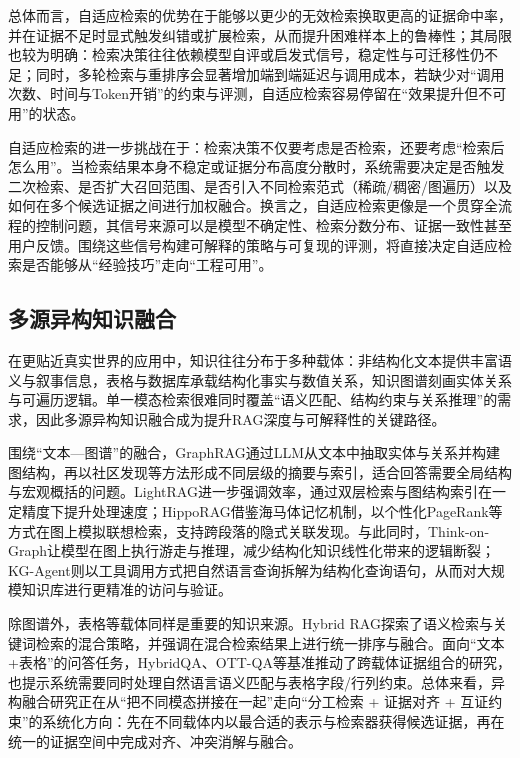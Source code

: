 总体而言，自适应检索的优势在于能够以更少的无效检索换取更高的证据命中率，并在证据不足时显式触发纠错或扩展检索，从而提升困难样本上的鲁棒性\cite{ref8, ref9, ref11, ref12}；其局限也较为明确：检索决策往往依赖模型自评或启发式信号，稳定性与可迁移性仍不足；同时，多轮检索与重排序会显著增加端到端延迟与调用成本，若缺少对“调用次数、时间与Token开销”的约束与评测，自适应检索容易停留在“效果提升但不可用”的状态\cite{ref10, ref12}。

自适应检索的进一步挑战在于：检索决策不仅要考虑是否检索，还要考虑“检索后怎么用”。当检索结果本身不稳定或证据分布高度分散时，系统需要决定是否触发二次检索、是否扩大召回范围、是否引入不同检索范式（稀疏/稠密/图遍历）以及如何在多个候选证据之间进行加权融合。换言之，自适应检索更像是一个贯穿全流程的控制问题，其信号来源可以是模型不确定性、检索分数分布、证据一致性甚至用户反馈。围绕这些信号构建可解释的策略与可复现的评测，将直接决定自适应检索是否能够从“经验技巧”走向“工程可用”。

\subsection{多源异构知识融合}
在更贴近真实世界的应用中，知识往往分布于多种载体：非结构化文本提供丰富语义与叙事信息，表格与数据库承载结构化事实与数值关系，知识图谱刻画实体关系与可遍历逻辑。单一模态检索很难同时覆盖“语义匹配、结构约束与关系推理”的需求，因此多源异构知识融合成为提升RAG深度与可解释性的关键路径。

围绕“文本—图谱”的融合，GraphRAG\cite{ref15}通过LLM从文本中抽取实体与关系并构建图结构，再以社区发现等方法形成不同层级的摘要与索引，适合回答需要全局结构与宏观概括的问题。LightRAG\cite{ref16}进一步强调效率，通过双层检索与图结构索引在一定精度下提升处理速度；HippoRAG\cite{ref14}借鉴海马体记忆机制，以个性化PageRank\cite{pagerank}等方式在图上模拟联想检索，支持跨段落的隐式关联发现。与此同时，Think-on-Graph\cite{ref17}让模型在图上执行游走与推理，减少结构化知识线性化带来的逻辑断裂；KG-Agent\cite{ref18}则以工具调用方式把自然语言查询拆解为结构化查询语句，从而对大规模知识库进行更精准的访问与验证。

除图谱外，表格等载体同样是重要的知识来源。Hybrid RAG\cite{ref19}探索了语义检索与关键词检索的混合策略，并强调在混合检索结果上进行统一排序与融合。面向“文本+表格”的问答任务，HybridQA\cite{hybridqa}、OTT-QA\cite{ottqa}等基准推动了跨载体证据组合的研究，也提示系统需要同时处理自然语言语义匹配与表格字段/行列约束。总体来看，异构融合研究正在从“把不同模态拼接在一起”走向“分工检索 + 证据对齐 + 互证约束”的系统化方向：先在不同载体内以最合适的表示与检索器获得候选证据，再在统一的证据空间中完成对齐、冲突消解与融合。

